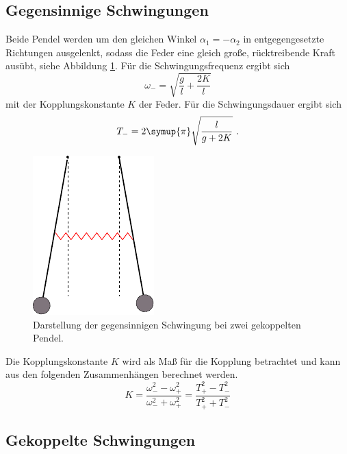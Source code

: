\subsection{Gegensinnige Schwingungen}
\label{sec:gegensinnige_schwingung}

    Beide Pendel werden um den gleichen Winkel $\alpha_1 = -\alpha_2$ in entgegengesetzte Richtungen ausgelenkt,
    sodass die Feder eine gleich große,
    rücktreibende Kraft ausübt,
    siehe Abbildung \ref{fig:gegensinnig}.
    Für die Schwingungsfrequenz ergibt sich
    \begin{equation}
        \omega_- = \sqrt{\frac{g}{l} + \frac{2K}{l}}
        \label{eqn:frequenz_gegensinnig}
    \end{equation}
    mit der Kopplungskonstante $K$ der Feder.
    Für die Schwingungsdauer ergibt sich 
    \begin{equation}
        T_- = 2\symup{\pi} \sqrt{\frac{l}{g + 2K}} \ .
        \label{eqn:dauer_gegensinnig}
    \end{equation} 
    \begin{figure}
        \centering
            \includegraphics[scale=0.9]{content/img/Abb_2.pdf}
            \caption{Darstellung der gegensinnigen Schwingung bei zwei gekoppelten Pendel.}
            \label{fig:gegensinnig}
    \end{figure}
    
    
    Die Kopplungskonstante $K$ wird als Maß für die Kopplung betrachtet und kann aus den folgenden Zusammenhängen berechnet werden.
    \begin{equation}
        K = \frac{\omega^2_- - \omega^2_+}{\omega^2_- + \omega^2_+} = \frac{T^2_+ - T^2_-}{T^2_+ + T^2_-} 
        \label{eqn:kopplungskonstante}
    \end{equation}

\subsection{Gekoppelte Schwingungen}    
\label{sec:gekoppelte_schwingung}   
        
